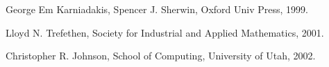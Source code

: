 

\begin{thebibliography}{9}

        George Em Karniadakis, Spencer J. Sherwin, \/
        Oxford Univ Press, 1999.

        Lloyd N. Trefethen, \/
        Society for Industrial and Applied Mathematics, 2001.

        Christopher R. Johnson, \/
        School of Computing, University of Utah, 2002.


\end{thebibliography}
